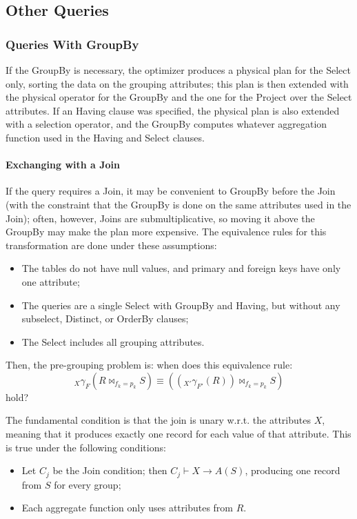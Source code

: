 \subsection{Other Queries}

\subsubsection{Queries With GroupBy}

If the GroupBy is necessary, the optimizer produces a physical plan for the Select only, sorting the data on the grouping attributes; this plan is then extended with the physical operator for the GroupBy and the one for the Project over the Select attributes. If an Having clause was specified, the physical plan is also extended with a selection operator, and the GroupBy computes whatever aggregation function used in the Having and Select clauses.

\paragraph{Exchanging with a Join}
If the query requires a Join, it may be convenient to GroupBy before the Join (with the constraint that the GroupBy is done on the same attributes used in the Join); often, however, Joins are submultiplicative, so moving it above the GroupBy may make the plan more expensive. The equivalence rules for this transformation are done under these assumptions:
\begin{itemize}
    \item The tables do not have null values, and primary and foreign keys have only one attribute;

    \item The queries are a single Select with GroupBy and Having, but without any subselect, Distinct, or OrderBy clauses;

    \item The Select includes all grouping attributes.
\end{itemize}
Then, the pre-grouping problem is: when does this equivalence rule:
\begin{equation*}
    {}_X \gamma_F (R \bowtie_{f_k = p_k} S) \equiv (({}_{X'} \gamma_{F'}(R)) \bowtie_{f_k = p_k} S)
\end{equation*}
hold?

The fundamental condition is that the join is unary w.r.t. the attributes $X$, meaning that it produces exactly one record for each value of that attribute. This is true under the following conditions:
\begin{itemize}
    \item Let $C_j$ be the Join condition; then $C_j \vdash X \rightarrow A(S)$, producing one record from $S$ for every group;

    \item Each aggregate function only uses attributes from $R$.
\end{itemize}

